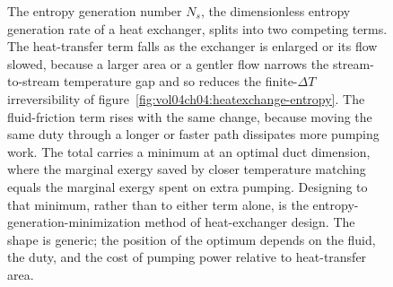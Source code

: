 \begin{figure}[htbp]
\centering
{}
\caption[Entropy-generation-minimization tradeoff in a heat exchanger]{The
entropy generation number $N_s$, the dimensionless entropy generation rate of a
heat exchanger, splits into two competing terms. The heat-transfer term falls as
the exchanger is enlarged or its flow slowed, because a larger area or a gentler
flow narrows the stream-to-stream temperature gap and so reduces the
finite-$\Delta T$ irreversibility of figure~\ref{fig:vol04ch04:heatexchange-entropy}.
The fluid-friction term rises with the same change, because moving the same duty
through a longer or faster path dissipates more pumping work. The total carries a
minimum at an optimal duct dimension, where the marginal exergy saved by closer
temperature matching equals the marginal exergy spent on extra pumping. Designing
to that minimum, rather than to either term alone, is the entropy-generation-minimization
method of heat-exchanger design. The shape is generic; the position of the
optimum depends on the fluid, the duty, and the cost of pumping power relative to
heat-transfer area.}
\label{fig:vol04ch04:egm-tradeoff}
\end{figure}

